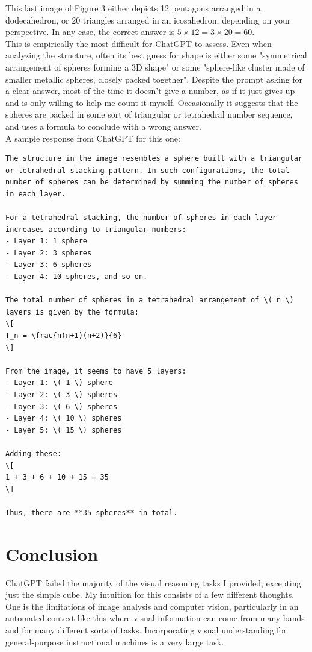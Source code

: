 \documentclass{article}
\begin{document}
	This last image of Figure 3 either depicts 12 pentagons arranged in a dodecahedron, or 20 triangles arranged in an icosahedron, depending on your perspective. In any case, the correct answer is $5 \times 12 = 3 \times 20 = 60$.
	\\
	
	This is empirically the most difficult for ChatGPT to assess. Even when analyzing the structure, often its best guess for shape is either some "symmetrical arrangement of spheres forming a 3D shape" or some "sphere-like cluster made of smaller metallic spheres, closely packed together". Despite the prompt asking for a clear answer, most of the time it doesn't give a number, as if it just gives up and is only willing to help me count it myself. Occasionally it suggests that the spheres are packed in some sort of triangular or tetrahedral number sequence, and uses a formula to conclude with a wrong answer.
	\\
	
	A sample response from ChatGPT for this one:
	\begin{lstlisting}
The structure in the image resembles a sphere built with a triangular or tetrahedral stacking pattern. In such configurations, the total number of spheres can be determined by summing the number of spheres in each layer.

For a tetrahedral stacking, the number of spheres in each layer increases according to triangular numbers:  
- Layer 1: 1 sphere  
- Layer 2: 3 spheres  
- Layer 3: 6 spheres  
- Layer 4: 10 spheres, and so on.

The total number of spheres in a tetrahedral arrangement of \( n \) layers is given by the formula:  
\[
T_n = \frac{n(n+1)(n+2)}{6}
\]

From the image, it seems to have 5 layers:
- Layer 1: \( 1 \) sphere  
- Layer 2: \( 3 \) spheres  
- Layer 3: \( 6 \) spheres  
- Layer 4: \( 10 \) spheres  
- Layer 5: \( 15 \) spheres  

Adding these:
\[
1 + 3 + 6 + 10 + 15 = 35
\]

Thus, there are **35 spheres** in total.
	\end{lstlisting}
	
	
	\section{Conclusion}
	
	ChatGPT failed the majority of the visual reasoning tasks I provided, excepting just the simple cube. My intuition for this consists of a few different thoughts. One is the limitations of image analysis and computer vision, particularly in an automated context like this where visual information can come from many bands and for many different sorts of tasks. Incorporating visual understanding for general-purpose instructional machines is a very large task.
	\\
	
\end{document}
